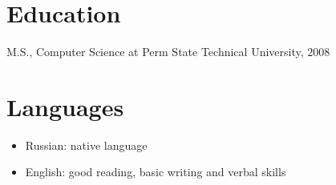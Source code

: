 \documentclass[12pt]{res}
\begin{document}
\begin{resume}
\section{Education}
M.S., Computer Science at Perm State Technical University, 2008

\section{Languages}
\begin{itemize}
\item Russian: native language
\item English: good reading, basic writing and verbal skills
\end{itemize}

\end{resume}
\end{document}
